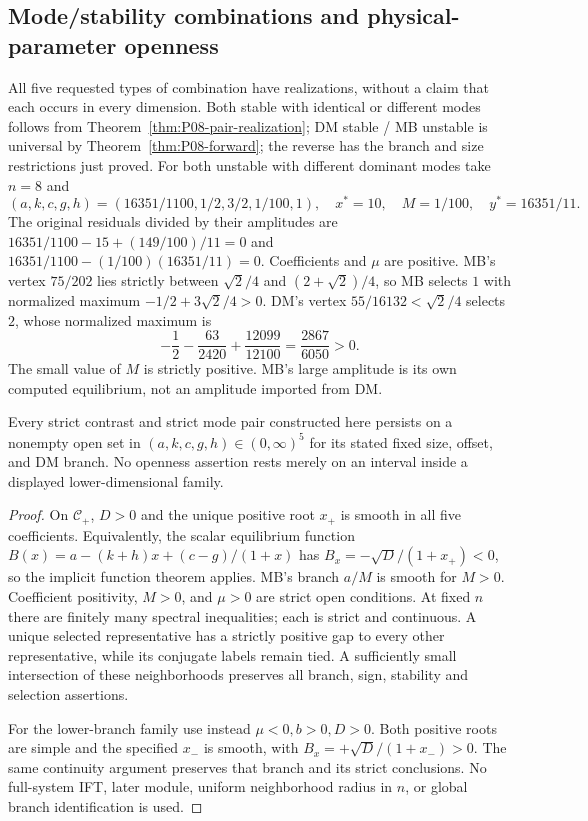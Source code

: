 \subsection{Mode/stability combinations and physical-parameter openness}
All five requested types of combination have realizations, without a
claim that each occurs in every dimension. Both stable with identical
or different modes follows from Theorem~\ref{thm:P08-pair-realization};
DM stable / MB unstable is universal by Theorem~\ref{thm:P08-forward};
the reverse has the branch and size restrictions just proved.
For both unstable with different dominant modes take $n=8$ and
\begin{equation}
 (a,k,c,g,h)=(16351/1100,1/2,3/2,1/100,1),\quad
 x^*=10,\quad M=1/100,\quad y^*=16351/11.
 \label{eq:P08-both-unstable}
\end{equation}
The original residuals divided by their amplitudes are
$16351/1100-15+(149/100)/11=0$ and
$16351/1100-(1/100)(16351/11)=0$. Coefficients and $\mu$ are positive.
MB's vertex $75/202$ lies strictly between $\sqrt2/4$ and
$(2+\sqrt2)/4$, so MB selects $1$ with normalized maximum
$-1/2+3\sqrt2/4>0$. DM's vertex $55/16132<\sqrt2/4$ selects $2$,
whose normalized maximum is
\[
 -\frac12-\frac{63}{2420}+\frac{12099}{12100}
 =\frac{2867}{6050}>0.
\]
The small value of $M$ is strictly positive. MB's large amplitude is
its own computed equilibrium, not an amplitude imported from DM.

\begin{proposition}
\label{prop:P08-open}
Every strict contrast and strict mode pair constructed here persists
on a nonempty open set in $(a,k,c,g,h)\in(0,\infty)^5$ for its stated
fixed size, offset, and DM branch. No openness assertion rests merely
on an interval inside a displayed lower-dimensional family.
\end{proposition}
\begin{proof}
On $\mathcal C_+$, $D>0$ and the unique positive root $x_+$ is smooth
in all five coefficients. Equivalently, the scalar equilibrium function
$B(x)=a-(k+h)x+(c-g)/(1+x)$ has
$B_x=-\sqrt D/(1+x_+)<0$, so the implicit function theorem applies.
MB's branch $a/M$ is smooth for $M>0$. Coefficient positivity,
$M>0$, and $\mu>0$ are strict open conditions. At fixed $n$ there
are finitely many spectral inequalities; each is strict and continuous.
A unique selected representative has a strictly positive gap to every
other representative, while its conjugate labels remain tied.
A sufficiently small intersection of these neighborhoods preserves all
branch, sign, stability and selection assertions.

For the lower-branch family use instead $\mu<0,b>0,D>0$.
Both positive roots are simple and the specified $x_-$ is smooth, with
$B_x=+\sqrt D/(1+x_-)>0$. The same continuity argument preserves
that branch and its strict conclusions. No full-system IFT, later
module, uniform neighborhood radius in $n$, or global branch
identification is used.
\end{proof}

